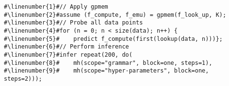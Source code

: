 \begin{mdframed}
\begin{minipage}{\linewidth}
\small
\belowcaptionskip=-10pt
\begin{lstlisting}[mathescape,label=alg:structureVent,basicstyle=\selectfont\ttfamily,numbers=none,caption={\gpmem\
inference for structure
learning: },escapechar=\#]
#\linenumber{1}#// Apply gpmem 
#\linenumber{2}#assume (f_compute, f_emu) = gpmem(f_look_up, K);
#\linenumber{3}#// Probe all data points
#\linenumber{4}#for (n = 0; n < size(data); n++) { 
#\linenumber{5}#	predict f_compute(first(lookup(data, n)))};
#\linenumber{6}#// Perform inference
#\linenumber{7}#infer repeat(200, do(
#\linenumber{8}#	mh(scope="grammar", block=one, steps=1),
#\linenumber{9}#	mh(scope="hyper-parameters", block=one, steps=2)));
\end{lstlisting}

\end{minipage}
\end{mdframed}
